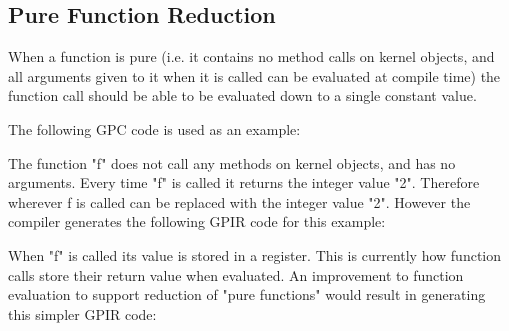 \subsection{Pure Function Reduction}

When a function is pure (i.e. it contains no method calls
on kernel objects, and all arguments given to it when it is called can be evaluated at 
compile time) the function call should be able to be evaluated down to a single constant value.

The following GPC code is used as an example:



The function "f" does not call any methods on kernel objects, and has no arguments.
Every time "f" is called it returns the integer value "2". Therefore wherever f is called can
be replaced with the integer value "2". However the compiler generates the following GPIR code
for this example:



When "f" is called its value is stored in a register. This is currently how function calls
store their return value when evaluated. An improvement to function evaluation to support
reduction of "pure functions" would result in generating this simpler GPIR code:


